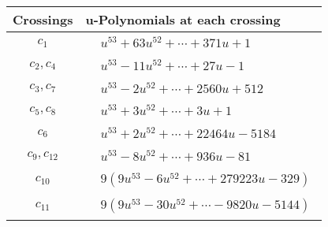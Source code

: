 \documentclass[1p]{elsarticle_modified}
\theoremstyle{definition}
\begin{document}
\begin{tabular}{m{50pt}|m{274pt}}
Crossings & \hspace{64pt}u-Polynomials at each crossing \\
\hline $$\begin{aligned}c_{1}\end{aligned}$$&$\begin{aligned}
&u^{53}+63 u^{52}+\cdots+371 u+1
\end{aligned}$\\
\hline $$\begin{aligned}c_{2},c_{4}\end{aligned}$$&$\begin{aligned}
&u^{53}-11 u^{52}+\cdots+27 u-1
\end{aligned}$\\
\hline $$\begin{aligned}c_{3},c_{7}\end{aligned}$$&$\begin{aligned}
&u^{53}-2 u^{52}+\cdots+2560 u+512
\end{aligned}$\\
\hline $$\begin{aligned}c_{5},c_{8}\end{aligned}$$&$\begin{aligned}
&u^{53}+3 u^{52}+\cdots+3 u+1
\end{aligned}$\\
\hline $$\begin{aligned}c_{6}\end{aligned}$$&$\begin{aligned}
&u^{53}+2 u^{52}+\cdots+22464 u-5184
\end{aligned}$\\
\hline $$\begin{aligned}c_{9},c_{12}\end{aligned}$$&$\begin{aligned}
&u^{53}-8 u^{52}+\cdots+936 u-81
\end{aligned}$\\
\hline $$\begin{aligned}c_{10}\end{aligned}$$&$\begin{aligned}
&9(9 u^{53}-6 u^{52}+\cdots+279223 u-329)
\end{aligned}$\\
\hline $$\begin{aligned}c_{11}\end{aligned}$$&$\begin{aligned}
&9(9 u^{53}-30 u^{52}+\cdots-9820 u-5144)
\end{aligned}$\\
\hline
\end{tabular}\\~\\
\end{document}
